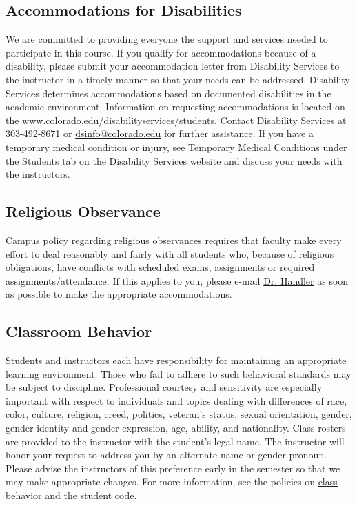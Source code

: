 \documentclass[10pt]{memoir}
\makeatletter
\def\instructorAemail{abram.handler@colorado.edu}
\makeatother
\begin{document}
\subsection{Accommodations for Disabilities}
We are committed to providing everyone the support and services needed to participate in this course. If you qualify for accommodations because of a disability, please submit your accommodation letter from Disability Services to the instructor in a timely manner so that your needs can be addressed. Disability Services determines accommodations based on documented disabilities in the academic environment. Information on requesting accommodations is located on the \href{Disability Services website}{www.colorado.edu/disabilityservices/students}. Contact Disability Services at 303-492-8671 or \href{mailto:dsinfo@colorado.edu}{dsinfo@colorado.edu} for further assistance. If you have a temporary medical condition or injury, see Temporary Medical Conditions under the Students tab on the Disability Services website and discuss your needs with the instructors.

\subsection{Religious Observance}
Campus policy regarding \href{http://www.colorado.edu/policies/observance-religious-holidays-and-absences-classes-andor-exams}{religious observances} requires that faculty make every effort to deal reasonably and fairly with all students who, because of religious obligations, have conflicts with scheduled exams, assignments or required assignments/attendance. If this applies to you, please e-mail \href{\instructorAemail}{Dr. Handler} as soon as possible to make the appropriate accommodations.

\subsection{Classroom Behavior}
Students and instructors each have responsibility for maintaining an appropriate learning environment. Those who fail to adhere to such behavioral standards may be subject to discipline. Professional courtesy and sensitivity are especially important with respect to individuals and topics dealing with differences of race, color, culture, religion, creed, politics, veteran’s status, sexual orientation, gender, gender identity and gender expression, age, ability, and nationality. Class rosters are provided to the instructor with the student's legal name. The instructor will honor your request to address you by an alternate name or gender pronoun. Please advise the instructors of this preference early in the semester so that we may make appropriate changes. For more information, see the policies on \href{http://www.colorado.edu/policies/student-classroom-and-course-related-behavior}{class behavior} and the \href{http://www.colorado.edu/osc/#student_code}{student code}.
\end{document}
